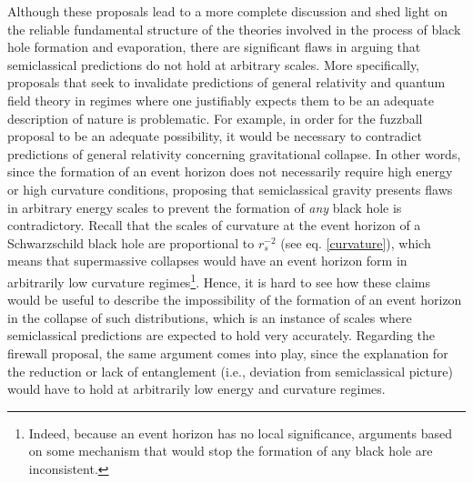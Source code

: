 \documentclass[
12pt,		%
openright,	%
twoside,  %
a4paper,			%
chapter=TITLE,		%
english,			%
french,				%
spanish,			%
brazil				%
]{USPSC-classe/USPSC}
\begin{document}
Although these proposals lead to a more complete discussion and shed light on the reliable fundamental structure of the theories involved in the process of black hole formation and evaporation, there are significant flaws in arguing that semiclassical predictions do not hold at arbitrary scales. More specifically, proposals that seek to invalidate predictions of general relativity and quantum field theory in regimes where one justifiably expects them to be an adequate description of nature is problematic. For example, in order for the fuzzball proposal to be an adequate possibility, it would be necessary to contradict predictions of general relativity concerning gravitational collapse. In other words, since the formation of an event horizon does not necessarily require high energy or high curvature conditions, proposing that semiclassical gravity presents flaws in arbitrary energy scales to prevent the formation of \textit{any} black hole is contradictory. Recall that the scales of curvature at the event horizon of a Schwarzschild black hole are proportional to $r_s^{-2}$ (see eq. \ref{curvature}), which means that supermassive collapses would have an event horizon form in arbitrarily low curvature regimes\footnote{Indeed, because an event horizon has no local significance, arguments based on some mechanism that would stop the formation of any black hole are inconsistent.}. Hence, it is hard to see how these claims would be useful to describe the impossibility of the formation of an event horizon in the collapse of such distributions, which is an instance of scales where semiclassical predictions are expected to hold very accurately. Regarding the firewall proposal, the same argument comes into play, since the explanation for the reduction or lack of entanglement (i.e., deviation from semiclassical picture) would have to hold at arbitrarily low energy and curvature regimes.
\end{document}
